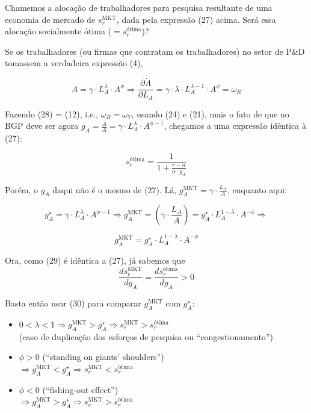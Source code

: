 \documentclass[a4paper,12pt]{article}[abntex2]
\begin{document}
Chamemos a alocação de trabalhadores para pesquisa resultante de uma economia de mercado de $s_r^{\text{MKT}}$, dada pela expressão (27) acima. Será essa alocação socialmente ótima ($= s_r^{\text{ótima}}$)?

Se os trabalhadores (ou firmas que contratam os trabalhadores) no setor de P\&D tomassem a verdadeira expressão (4),

\[
\dot{A} = \gamma \cdot L_A^\lambda \cdot A^\phi \Rightarrow
\frac{\partial \dot{A}}{\partial L_A} = \gamma \cdot \lambda \cdot L_A^{\lambda - 1} \cdot A^\phi = \omega_R \tag{28}
\]

Fazendo (28) = (12), i.e., $\omega_R = \omega_Y$, usando (24) e (21), mais o fato de que no BGP deve ser agora $g_A = \frac{\dot{A}}{A} = \gamma \cdot L_A^\lambda \cdot A^{\phi - 1}$, chegamos a uma expressão idêntica à (27):

\[
s_r^{\text{ótima}} = \frac{1}{1 + \frac{r - n}{\alpha \cdot g_A}} \tag{29}
\]

Porém, o $g_A$ daqui não é o mesmo de (27). Lá, $g_A^{\text{MKT}} = \gamma \cdot \frac{L_A}{A}$, enquanto aqui:

\[
g_A^{\star} = \gamma \cdot L_A^\lambda \cdot A^{\phi - 1}
\Rightarrow
g_A^{\text{MKT}} = (\gamma \cdot \frac{L_A}{A}) = g_A^{\star} \cdot L_A^{1 - \lambda} \cdot A^{-\phi}
\Rightarrow
\]

\[
g_A^{\text{MKT}} = g_A^{\star} \cdot L_A^{1 - \lambda} \cdot A^{-\phi} \tag{30}
\]

Ora, como (29) é idêntica a (27), já sabemos que
\[
\frac{ds_r^{\text{MKT}}}{dg_A} = \frac{ds_r^{\text{ótima}}}{dg_A} > 0
\]

Basta então usar (30) para comparar $g_A^{\text{MKT}}$ com $g_A^{\star}$:

\begin{itemize}
    \item $0 < \lambda < 1 \Rightarrow g_A^{\text{MKT}} > g_A^{\star} \Rightarrow s_r^{\text{MKT}} > s_r^{\text{ótima}}$ \\
    (caso de duplicação dos esforços de pesquisa ou “congestionamento”)

    \item $\phi > 0$ (“standing on giants’ shoulders”) \\
    $\Rightarrow g_A^{\text{MKT}} < g_A^{\star} \Rightarrow s_r^{\text{MKT}} < s_r^{\text{ótima}}$

    \item $\phi < 0$ (“fishing-out effect”) \\
    $\Rightarrow g_A^{\text{MKT}} > g_A^{\star} \Rightarrow s_r^{\text{MKT}} > s_r^{\text{ótima}}$
\end{itemize}
\end{document}
